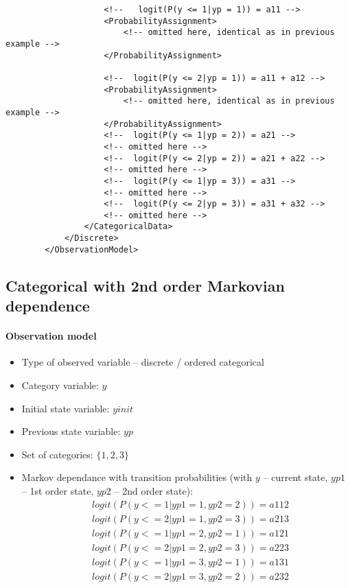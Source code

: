 \begin{lstlisting}
                    <!--   logit(P(y <= 1|yp = 1)) = a11 -->
                    <ProbabilityAssignment>
                        <!-- omitted here, identical as in previous example -->
                    </ProbabilityAssignment>
                    
                    <!--  logit(P(y <= 2|yp = 1)) = a11 + a12 -->
                    <ProbabilityAssignment>
                        <!-- omitted here, identical as in previous example -->
                    </ProbabilityAssignment>
                    <!--  logit(P(y <= 1|yp = 2)) = a21 -->
                    <!-- omitted here -->
                    <!--  logit(P(y <= 2|yp = 2)) = a21 + a22 -->
                    <!-- omitted here -->
                    <!--  logit(P(y <= 1|yp = 3)) = a31 -->
                    <!-- omitted here -->
                    <!--  logit(P(y <= 2|yp = 3)) = a31 + a32 -->
                    <!-- omitted here -->
                </CategoricalData>
            </Discrete>
        </ObservationModel>
\end{lstlisting}


\subsection{Categorical with 2nd order Markovian dependence}

\paragraph{Observation model}

\begin{itemize}
\item
Type of observed variable -- discrete / ordered categorical
\item
Category variable: $y$
\item
Initial state variable: $yinit$
\item
Previous state variable: $yp$
\item
Set of categories: $\{1,2,3\}$
\item
Markov dependance with transition probabilities (with $y$ -- current state, $yp1$ -- 1st order state, $yp2$ -- 2nd order state):
\begin{align}
& logit(P(y<=1 | yp1=1, yp2=2)) = a112 \nonumber \\
& logit(P(y<=2 | yp1=1, yp2=3)) = a213 \nonumber \\
& logit(P(y<=1 | yp1=2, yp2=1)) = a121 \nonumber \\
& logit(P(y<=2 | yp1=2, yp2=3)) = a223 \nonumber \\
& logit(P(y<=1 | yp1=3, yp2=1)) = a131 \nonumber \\
& logit(P(y<=2 | yp1=3, yp2=2)) = a232 \nonumber 
\end{align}
\end{itemize}

